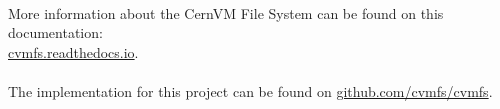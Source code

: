 \paragraph{}
More information about the CernVM File System can be found on this documentation:\\
\href{https://cvmfs.readthedocs.io/en/stable/}{cvmfs.readthedocs.io}.
\paragraph{}The implementation for this project can be found on \href{https://github.com/cvmfs/cvmfs/pulls?q=is\%3Apr+author\%3Adosarudaniel+is\%3Aclosed}{github.com/cvmfs/cvmfs}.

